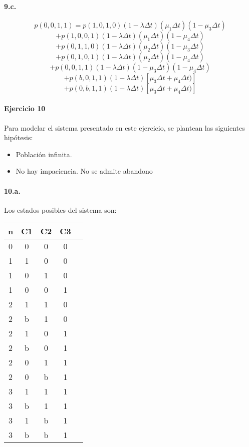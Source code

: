 \documentclass{article}
\begin{document}
   \paragraph{9.c.}
      $$p(0,0,1,1) = p(1,0,1,0) (1 - \lambda \Delta t) (\mu_1 \Delta t) (1 - \mu_3 \Delta t)$$
      $$           + p(1,0,0,1) (1 - \lambda \Delta t) (\mu_1 \Delta t) (1 - \mu_4 \Delta t)$$
      $$           + p(0,1,1,0) (1 - \lambda \Delta t) (\mu_2 \Delta t) (1 - \mu_3 \Delta t)$$
      $$           + p(0,1,0,1) (1 - \lambda \Delta t) (\mu_2 \Delta t) (1 - \mu_4 \Delta t)$$
      $$           + p(0,0,1,1) (1 - \lambda \Delta t) (1 - \mu_3 \Delta t) (1 - \mu_4 \Delta t)$$
      $$           + p(b,0,1,1) (1 - \lambda \Delta t) [\mu_3 \Delta t + \mu_4 \Delta t)]$$
      $$           + p(0,b,1,1) (1 - \lambda \Delta t) [\mu_3 \Delta t + \mu_4 \Delta t)]$$


\paragraph{Ejercicio 10}
   Para modelar el sistema presentado en este ejercicio, se plantean las siguientes hip\'otesis:

   \begin{itemize}
      \item Poblaci\'on infinita.
      \item No hay impaciencia. No se admite abandono
   \end{itemize}

   \paragraph{10.a.} Los estados posibles del sistema son:
   \begin{center}
   \begin{tabular}{|| c | c | c | c | c ||}
   \hline 
      n & C1 & C2 & C3 \\ \hline \hline
      0 & 0  & 0  & 0   \\ \hline \hline
      1 & 1  & 0  & 0    \\ \hline 
      1 & 0  & 1  & 0    \\ \hline
      1 & 0  & 0  & 1    \\ \hline \hline
      2 & 1  & 1  & 0   \\ \hline
      2 & b  & 1  & 0    \\ \hline
      2 & 1  & 0  & 1    \\ \hline
      2 & b  & 0  & 1    \\ \hline
      2 & 0  & 1  & 1    \\ \hline
      2 & 0  & b  & 1    \\ \hline \hline
      3 & 1  & 1  & 1    \\ \hline
      3 & b  & 1  & 1    \\ \hline
      3 & 1  & b  & 1    \\ \hline
      3 & b  & b  & 1    \\ \hline
   \end{tabular}
   \end{center}
\end{document}
